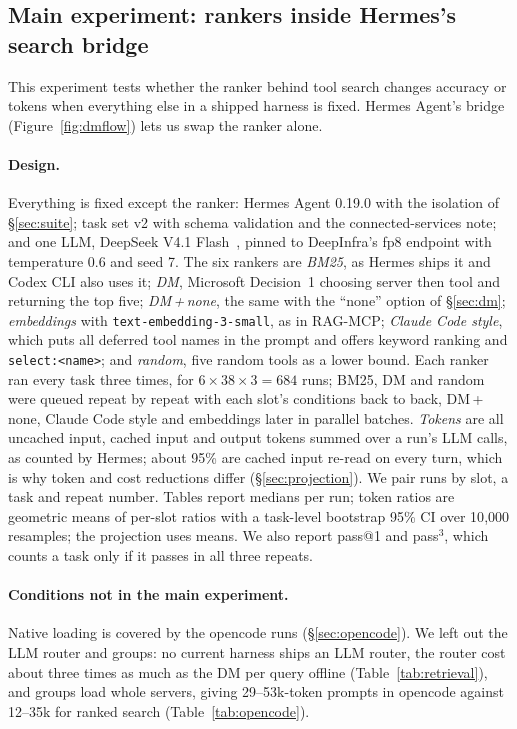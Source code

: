 \documentclass[11pt]{article}
\newcommand{\dmn}{DM\,+\,none}
\begin{document}
\subsection{Main experiment: rankers inside Hermes's search bridge}\label{sec:final}
This experiment tests whether the ranker behind tool search changes accuracy or tokens when everything else in a
shipped harness is fixed. Hermes Agent's bridge (Figure~\ref{fig:dmflow}) lets us swap the ranker alone.

\paragraph{Design.} Everything is fixed except the ranker: Hermes Agent 0.19.0 with the isolation of
\S\ref{sec:suite}; task set v2 with schema validation and the connected-services note; and one LLM, DeepSeek V4.1
Flash~\citep{deepseekv41}, pinned to DeepInfra's fp8 endpoint with temperature 0.6 and seed 7. The six rankers are
\emph{BM25}, as Hermes ships it and Codex CLI also uses it; \emph{DM}, Microsoft Decision~1 choosing server then
tool and returning the top five; \emph{\dmn{}}, the same with the ``none'' option of \S\ref{sec:dm};
\emph{embeddings} with \texttt{text-embedding-3-small}, as in RAG-MCP; \emph{Claude Code style}, which puts all
deferred tool names in the prompt and offers keyword ranking and \texttt{select:<name>}; and \emph{random}, five
random tools as a lower bound. Each ranker ran every task three times, for $6 \times 38 \times 3 = 684$ runs;
BM25, DM and random were queued repeat by repeat with each slot's conditions back to back, \dmn{}, Claude Code
style and embeddings later in parallel batches. \emph{Tokens} are all uncached input, cached input and output
tokens summed over a run's LLM calls, as counted by Hermes; about 95\% are cached input re-read on every turn,
which is why token and cost reductions differ (\S\ref{sec:projection}). We pair runs by slot, a task and repeat
number. Tables report medians per run; token ratios are geometric means of per-slot ratios with a task-level
bootstrap 95\% CI over 10{,}000 resamples; the projection uses means. We also report pass@1 and pass$^3$, which
counts a task only if it passes in all three repeats.

\paragraph{Conditions not in the main experiment.} Native loading is covered by the opencode runs
(\S\ref{sec:opencode}). We left out the LLM router and groups: no current harness ships an LLM router, the router
cost about three times as much as the DM per query offline (Table~\ref{tab:retrieval}), and groups load whole
servers, giving 29--53k-token prompts in opencode against 12--35k for ranked search (Table~\ref{tab:opencode}).
\end{document}
